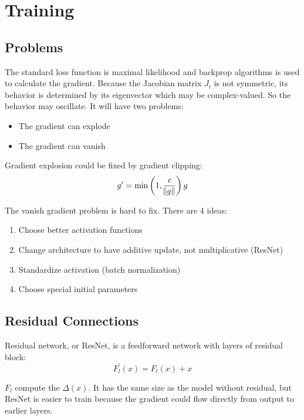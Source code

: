 \chapter{Training}

\section{Problems}
The standard loss function is maximal likelihood and backprop algorithms is used to calculate the gradient. Because the Jacobian matrix $J_i$ is not symmetric, its behavior is determined by its eigenvector which may be complex-valued. So the behavior may oscillate. It will have two problems:
\begin{itemize}
    \item The gradient can explode
    \item The gradient can vanish
\end{itemize}

Gradient explosion could be fixed by gradient clipping:
\begin{equation}
    g' = \min \left(1, \frac{c}{\norm{g}}\right)g
\end{equation}

The vanish gradient problem is hard to fix. There are 4 ideas:
\begin{enumerate}
    \item Choose better activation functions
    \item Change architecture to have additive update, not multiplicative (ResNet)
    \item Standardize activation (batch normalization)
    \item Choose special initial parameters
\end{enumerate}


\section{Residual Connections}

Residual network, or ResNet, is a feedforward network with layers of residual block:
\begin{equation}
    F_l^{'} (x) = F_l (x) + x
\end{equation}

$F_l$ compute the $\Delta(x)$. It has the same size as the model without residual, but ResNet is easier to train because the gradient could flow directly from output to earlier layers.


